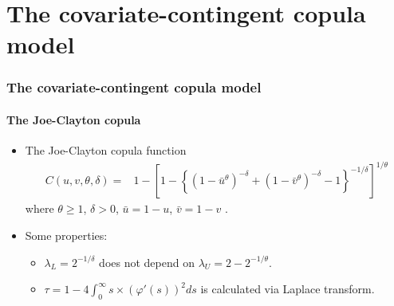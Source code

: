 \documentclass{beamer}
\begin{document}
\section{The covariate-contingent copula model}
\begin{frame}
  \frametitle{The covariate-contingent copula model}
  \framesubtitle{The Joe-Clayton copula}
  \begin{itemize}
  \item The Joe-Clayton copula function
    \[
    \begin{split}
      C(u,v,\theta,\delta)=&1-\left[1-\left\{\left(1-\bar u ^{\theta }\right)^{-\delta
          }+\left(1-\bar v ^{\theta }\right)^{-\delta }-1\right\}^{-1/\delta
        }\right]^{1/\theta }
    \end{split}
    \]
    where $\theta \geq 1$, $\delta > 0$, $\bar u = 1-u$, $\bar v = 1-v$ .

  \item Some properties:
    \begin{itemize}
    \item $\lambda_L=2^{-1/\delta}$ does not depend on $\lambda_U=2-2^{-1/\theta}$.
    \item  $\tau=1- 4\int _0^{\infty} s\times(\varphi'(s))^2ds$ is calculated via Laplace transform.
    \end{itemize}
  \end{itemize}

\end{frame}
\end{document}
